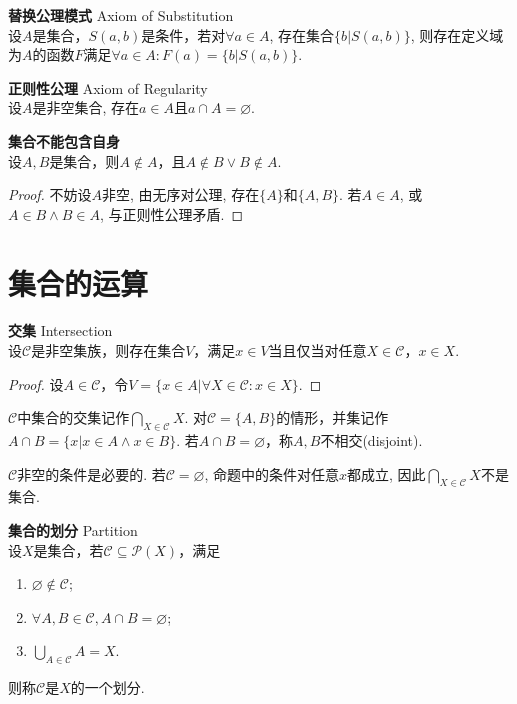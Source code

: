 \begin{axi} \textbf{替换公理模式} Axiom of Substitution\\
设$A$是集合，$S(a,b)$是条件，若对$\forall a\in A$, 存在集合$\{b\vert S(a,b)\}$, 则存在定义域为$A$的函数$F$满足$\forall a\in A: F(a)=\{b\vert S(a,b)\}$. 
\end{axi}

\begin{axi} \textbf{正则性公理} Axiom of Regularity\\
设$A$是非空集合, 存在$a\in A$且$a\cap A=\varnothing$. 
\end{axi}

\begin{col}\textbf{集合不能包含自身}\\
设$A, B$是集合，则$A\notin A$，且$A\notin B\lor B\notin A$.
\label{col:self_inclusion}
\end{col}
\begin{proof}
不妨设$A$非空, 由无序对公理, 存在$\{A\}$和$\{A,B\}$. 若$A\in A$, 或$A\in B\land B\in A$, 与正则性公理矛盾. 
\end{proof}

\section{集合的运算}

\begin{pro} \textbf{交集} Intersection\\
设$\mathcal{C}$是非空集族，则存在集合$V$，满足$x\in V$当且仅当对任意$X\in \mathcal{C}$，$x\in X$. 
\end{pro}
\begin{proof}
    设$A\in \mathcal{C}$，令$V=\{x\in A\vert \forall X\in \mathcal{C}: x\in X\}$.
\end{proof}
$\mathcal{C}$中集合的交集记作$\bigcap_{X\in \mathcal{C}}X$. 对$\mathcal{C}=\{A,B\}$的情形，并集记作$A\cap B=\{x|x\in A \land x\in B\}$. 若$A\cap B=\varnothing$，称$A, B$不相交(disjoint). 
\par $\mathcal{C}$非空的条件是必要的. 若$\mathcal{C}=\varnothing$, 命题中的条件对任意$x$都成立, 因此$\bigcap_{X\in \mathcal{C}}X$不是集合. 

\begin{dfn} \textbf{集合的划分} Partition\\
设$X$是集合，若$\mathcal{C}\subseteq \mathcal{P}(X)$，满足
\begin{enumerate}
    \item $\varnothing \notin \mathcal{C}$;
    \item $\forall A,B \in \mathcal{C}, A\cap B=\varnothing$;
    \item $\bigcup_{A\in \mathcal{C}} A=X$.
\end{enumerate}
则称$\mathcal{C}$是$X$的一个划分.
\end{dfn}


